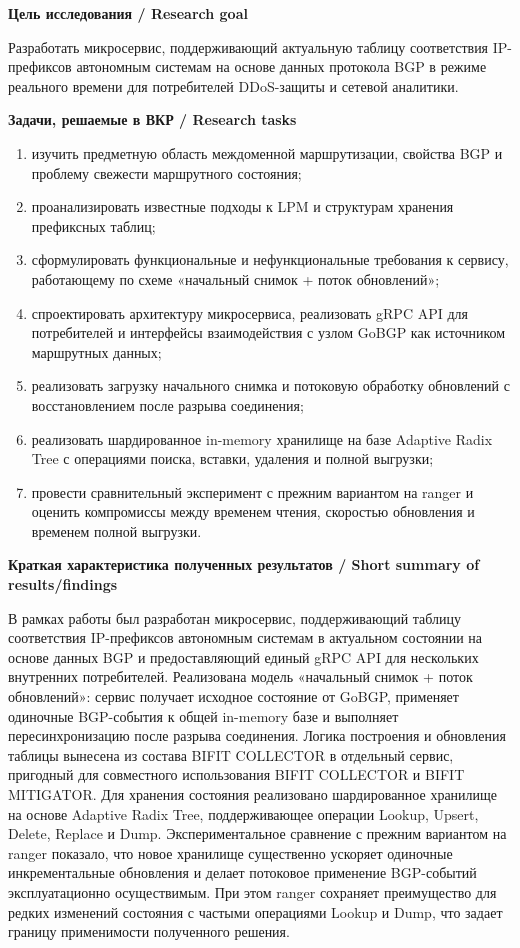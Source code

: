 \documentclass[14pt,a4paper]{extarticle}
\newcommand{\annotationsection}[2]{%
  \textbf{#1 / #2}\par
}
\begin{document}
\annotationsection{Цель исследования}{Research goal}
Разработать микросервис, поддерживающий актуальную таблицу соответствия
IP-префиксов автономным системам на основе данных протокола BGP в режиме
реального времени для потребителей DDoS-защиты и сетевой аналитики.

\annotationsection{Задачи, решаемые в ВКР}{Research tasks}
\begin{enumerate}
\item изучить предметную область междоменной маршрутизации, свойства BGP
и проблему свежести маршрутного состояния;
\item проанализировать известные подходы к LPM и структурам хранения
префиксных таблиц;
\item сформулировать функциональные и нефункциональные требования к
сервису, работающему по схеме «начальный снимок + поток обновлений»;
\item спроектировать архитектуру микросервиса, реализовать gRPC API для
потребителей и интерфейсы взаимодействия с узлом GoBGP как источником
маршрутных данных;
\item реализовать загрузку начального снимка и потоковую обработку
обновлений с восстановлением после разрыва соединения;
\item реализовать шардированное in-memory хранилище на базе
Adaptive Radix Tree с операциями поиска, вставки, удаления и полной
выгрузки;
\item провести сравнительный эксперимент с прежним вариантом на ranger
и оценить компромиссы между временем чтения, скоростью обновления и
временем полной выгрузки.
\end{enumerate}

\annotationsection{Краткая характеристика полученных результатов}{Short summary of results/findings}
В рамках работы был разработан микросервис, поддерживающий таблицу соответствия IP-префиксов автономным системам в 
актуальном состоянии на основе данных BGP и предоставляющий единый gRPC API для нескольких внутренних потребителей.
Реализована модель «начальный снимок + поток обновлений»: сервис
получает исходное состояние от GoBGP, применяет одиночные BGP-события к
общей in-memory базе и выполняет пересинхронизацию после разрыва
соединения. Логика построения и обновления таблицы вынесена из состава
BIFIT COLLECTOR в отдельный сервис, пригодный для совместного
использования BIFIT COLLECTOR и BIFIT MITIGATOR. Для хранения состояния
реализовано шардированное хранилище на основе Adaptive Radix Tree,
поддерживающее операции Lookup, Upsert, Delete, Replace и Dump.
Экспериментальное сравнение с прежним вариантом на ranger показало, что
новое хранилище существенно ускоряет одиночные инкрементальные
обновления и делает потоковое применение BGP-событий эксплуатационно
осуществимым. При этом ranger сохраняет преимущество для редких
изменений состояния с частыми операциями Lookup и Dump, что задает
границу применимости полученного решения.
\end{document}

